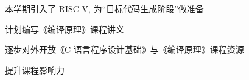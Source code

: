 \begin{frame}{}
  \begin{center}

    \vspace{0.30cm}
    本学期引入了 RISC-V, 为``目标代码生成阶段''做准备
  \end{center}
\end{frame}

\begin{frame}{}
  \begin{center}
    计划编写《编译原理》课程讲义

    \vspace{0.80cm}

    逐步对外开放《C 语言程序设计基础》与《编译原理》课程资源

    \vspace{0.30cm}
    提升课程影响力
  \end{center}
\end{frame}
